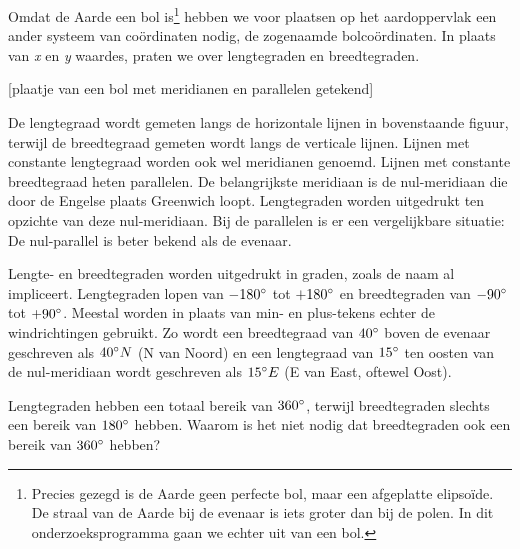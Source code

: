 Omdat de Aarde een bol is\footnote{Precies gezegd is de Aarde geen perfecte bol, maar een afgeplatte elipso\"ide. De straal van de Aarde bij de evenaar is iets groter dan bij de polen. In dit onderzoeksprogramma gaan we echter uit van een bol.} hebben we voor plaatsen op het aardoppervlak een ander systeem van co\"ordinaten nodig, de zogenaamde bolco\"ordinaten. In plaats van \textit{x} en \textit{y} waardes, praten we over lengtegraden en breedtegraden.

[plaatje van een bol met meridianen en parallelen getekend]

De lengtegraad wordt gemeten langs de horizontale lijnen in bovenstaande figuur, terwijl de breedtegraad gemeten wordt langs de verticale lijnen. Lijnen met constante lengtegraad worden ook wel meridianen genoemd. Lijnen met constante breedtegraad heten parallelen. De belangrijkste meridiaan is de nul-meridiaan die door de Engelse plaats Greenwich loopt. Lengtegraden worden uitgedrukt ten opzichte van deze nul-meridiaan. Bij de parallelen is er een vergelijkbare situatie: De nul-parallel is beter bekend als de evenaar.

Lengte- en breedtegraden worden uitgedrukt in graden, zoals de naam al impliceert. Lengtegraden lopen van $-180\degree$ tot $+180\degree$ en breedtegraden van $-90\degree$ tot $+90\degree$. Meestal worden in plaats van min- en plus-tekens echter de windrichtingen gebruikt. Zo wordt een breedtegraad van $40\degree$ boven de evenaar geschreven als $40\degree N$ (N van Noord) en een lengtegraad van $15\degree$ ten oosten van de nul-meridiaan wordt geschreven als $15\degree E$ (E van East, oftewel Oost).

\begin{opgave}
	Lengtegraden hebben een totaal bereik van $360\degree$, terwijl breedtegraden slechts een bereik van $180\degree$ hebben. Waarom is het niet nodig dat breedtegraden ook een bereik van $360\degree$ hebben?
\end{opgave}

